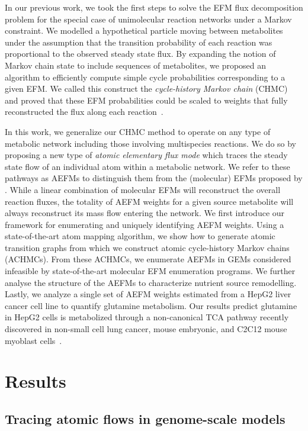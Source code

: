 \documentclass[12pt]{article}
\begin{document}
In our previous work, we took the first steps to solve the EFM flux
decomposition problem for the special case of unimolecular reaction
networks under a Markov constraint. We modelled a hypothetical particle
moving between metabolites under the assumption that the transition
probability of each reaction was proportional to the observed steady state
flux. By expanding the notion of Markov chain state to include sequences
of metabolites, we proposed an algorithm to efficiently compute simple
cycle probabilities corresponding to a given EFM. We called this construct
the \emph{cycle-history Markov chain} (CHMC) and proved that these EFM
probabilities could be scaled to weights that fully reconstructed the flux
along each reaction~\citep{ChitpinJustinG2023AMct}.

In this work, we generalize our CHMC method to operate on any type of
metabolic network including those involving multispecies reactions. We do
so by proposing a new type of \emph{atomic elementary flux mode} which
traces the steady state flow of an individual atom within a metabolic
network. We refer to these pathways as AEFMs to distinguish them from the
(molecular) EFMs proposed by
\citeauthor{SchusterStefan1994Oefm}. While a linear
combination of molecular EFMs will reconstruct the overall reaction fluxes, the
totality of AEFM weights for a given source metabolite will always reconstruct
its mass flow entering the network. We first introduce our framework for
enumerating and uniquely identifying AEFM weights. Using a state-of-the-art
atom mapping algorithm, we show how to generate atomic transition graphs from
which we construct atomic cycle-history Markov chains (ACHMCs). From these
ACHMCs, we enumerate AEFMs in GEMs considered infeasible by state-of-the-art
molecular EFM enumeration programs. We further analyse the structure of the
AEFMs to characterize nutrient source remodelling. Lastly, we analyze a single
set of AEFM weights estimated from a HepG2 liver cancer cell line to quantify
glutamine metabolism. Our results predict glutamine in HepG2 cells is
metabolized through a non-canonical TCA pathway recently discovered in
non-small cell lung cancer, mouse embryonic, and C2C12 mouse myoblast
cells~\citep{ArnoldPaigeK2022Anta}.

\section*{Results}

\subsection*{Tracing atomic flows in genome-scale models} %
\end{document}

